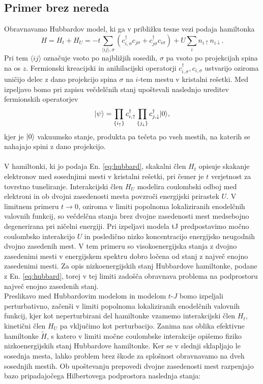 {\begin{appendices}
\section{Primer brez nereda}
Obravnavamo Hubbardov model, ki ga v približku tesne vezi podaja hamiltonka
\begin{equation}\label{eq:hubbard}
H=H_t + H_U=-t\sum\limits_{\langle ij \rangle, \sigma}\left(c^\dagger_{i,\sigma} c_{j\sigma} + c^\dagger_{j\sigma}c_{i\sigma}\right) + U\sum_i n_{i\uparrow}n_{i\downarrow}.
\end{equation}
Pri tem  $\langle ij \rangle$ označuje vsoto po najbližjih sosedih, $\sigma$ pa vsoto po projekcijah spina na os $z$. Fermionski kreacijski in anihilacijski operatorji $c^\dagger_{i,\sigma}, c_{i,\sigma}$ ustvarijo oziroma uničijo delec z dano projekcijo spina $\sigma$ na $i$-tem mestu v kristalni rešetki.  Med izpeljavo bomo pri zapisu večdelčnih stanj upoštevali naslednjo ureditev fermionskih operatorjev
$$
\vert\psi\rangle=\prod\limits_{\{i_\uparrow \}} c_{i, \uparrow}^\dagger \prod\limits_{\{j_\downarrow \}} c_{j, \downarrow}^\dagger \vert0\rangle,
$$
kjer je $\vert0\rangle$ vakuumsko stanje, produkta pa tečeta po vseh mestih, na katerih se nahajajo spini z dano projekcijo. \\\\
V hamiltonki, ki jo podaja En. \eqref{eq:hubbard}, skakalni člen $H_t$ opisuje skakanje elektronov med sosednjimi mesti v kristalni rešetki, pri čemer je $t$ verjetnost za tovrstno tuneliranje. Interakcijski člen $H_U$ modelira coulombski odboj med elektroni in ob dvojni zasedenosti mesta povzroči energijski prirastek $U$. V limitnem primeru $t\to 0$, oziroma v limiti popolnoma lokaliziranih enodelčnih valovnih funkcij, so večdelčna stanja brez dvojne zasedenosti mest medsebojno degenerirana pri ničelni energiji. Pri izpeljavi modela tJ predpostavimo močno coulombsko interakcijo $U$ in posledično nizko koncentracijo energijsko neugodnih dvojno zasedenih mest. V tem primeru so visokoenergijska stanja z dvojno zasedenimi mesti v energijskem spektru dobro ločena od stanj z največ enojno zasedenimi mesti. Za opis nizkoenergijskih stanj Hubbardove hamiltonke, podane z En. \eqref{eq:hubbard}, torej v tej limiti zadošča obravnava problema na podprostoru največ enojno zasedenih stanj.  \\
Preslikavo med Hubbardovim modelom in modelom $t$-$J$ bomo izpeljali perturbativno, začenši v limiti popolnoma lokaliziranih enodelčnih valovnih funkcij, kjer kot neperturbirani del hamiltonke vzamemo interakcijski člen $H_t$, kinetični člen $H_U$ pa vključimo kot perturbacijo. Zanima nas oblika efektivne hamiltonke $\tilde{H}$, s katero v limiti močne coulombske interakcije opišemo fiziko nizkoenergijskih stanj Hubbardove hamiltonke. Ker se v slednji sklapljajo le sosednja mesta, lahko problem brez škode za splošnost obravnavamo na dveh sosednjih mestih. Ob upoštevanju prepovedi dvojne zasedenosti mest razpenjajo bazo pripadajočega Hilbertovega podprostora naslednja stanja:

\end{appendices}}
